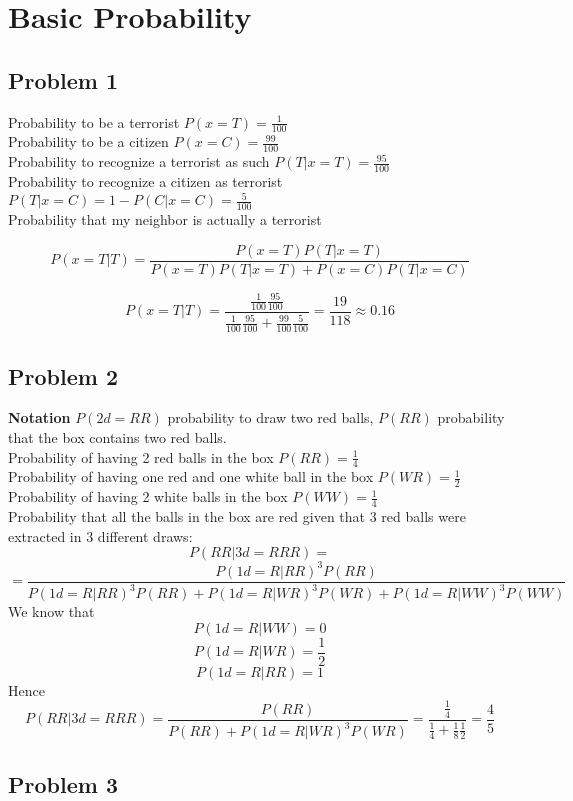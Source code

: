 \section{Basic Probability}
\subsection*{Problem 1}

Probability to be a terrorist $P(x=T)=\frac{1}{100}$ \\
Probability to be a citizen $P(x=C)=\frac{99}{100}$ \\
Probability to recognize a terrorist as such $P(T|x=T)=\frac{95}{100}$
\\
Probability to recognize a citizen as terrorist
$P(T|x=C)=1-P(C|x=C)=\frac{5}{100}$
\\
Probability that my neighbor is actually a terrorist 

\[
P(x=T|T)=\frac{P(x=T)P(T|x=T)}{P(x=T)P(T|x=T)+P(x=C)P(T|x=C)}
\]


\[
P(x=T|T)=\frac{\frac{1}{100}\frac{95}{100}}{\frac{1}{100}\frac{95}{100}+\frac{99}{100}\frac{5}{100}}=\frac{19}{118}\approx0.16
\]



\subsection*{Problem 2}

\textbf{Notation} $P(2d=RR)$ probability to draw two red balls, $P(RR)$
probability that the box contains two red balls.\\
Probability of having 2 red balls in the box $P(RR)=\frac{1}{4}$\\
Probability of having one red and one white ball in the box
$P(WR)=\frac{1}{2}$\\
Probability of having 2 white balls in the box $P(WW)=\frac{1}{4}$\\
Probability that all the balls in the box are red given that 3 red
balls were extracted in 3 different draws:
\[
P(RR|3d=RRR)=
\]
\[
=\frac{P(1d=R|RR)^3P(RR)}{P(1d=R|RR)^{3}P(RR)+P(1d=R|WR)^{3}P(WR)+P(1d=R|WW)^{3}P(WW)}
\]
We know that
\[
P(1d=R|WW)=0
\]
\[
P(1d=R|WR)=\frac{1}{2}
\]
\[
P(1d=R|RR)=1
\]
Hence
\[
P(RR|3d=RRR)=\frac{P(RR)}{P(RR)+P(1d=R|WR)^{3}P(WR)}=\frac{\frac{1}{4}}{\frac{1}{4}+\frac{1}{8}\frac{1}{2}}=\frac{4}{5}
\]



\subsection*{Problem 3}

